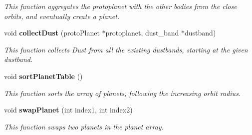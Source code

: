 \begin{CompactItemize}
\begin{CompactList}\small\item\em This function aggregates the protoplanet with the other bodies from the close orbits, and eventually create a planet. \item\end{CompactList}\item 
void {\bf collect\-Dust} (proto\-Planet $\ast$protoplanet, dust\_\-band $\ast$dustband)
\begin{CompactList}\small\item\em This function collects Dust from all the existing dustbands, starting at the given dustband. \item\end{CompactList}\item 
void {\bf sort\-Planet\-Table} ()\label{class_s_g___stardust_b8}

\begin{CompactList}\small\item\em This function sorts the array of planets, following the increasing orbit radius. \item\end{CompactList}\item 
void {\bf swap\-Planet} (int index1, int index2)\label{class_s_g___stardust_b9}

\begin{CompactList}\small\item\em This function swaps two planets in the planet array. \item\end{CompactList}\end{CompactItemize}
